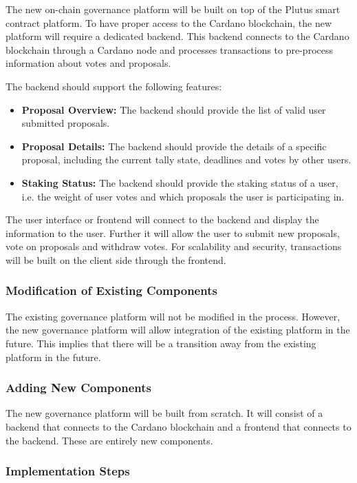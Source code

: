 \documentclass[11pt]{article}
\begin{document}
The new on-chain governance platform will be built on top of the Plutus smart contract platform.
To have proper access to the Cardano blockchain, the new platform will require a dedicated backend.
This backend connects to the Cardano blockchain through a Cardano node and processes transactions
to pre-process information about votes and proposals.

The backend should support the following features:
\begin{itemize}
    \item \textbf{Proposal Overview:} The backend should provide the list of valid user submitted proposals.
    \item \textbf{Proposal Details:} The backend should provide the details of a specific proposal, including the current tally state, deadlines and votes by other users.
    \item \textbf{Staking Status:} The backend should provide the staking status of a user, i.e. the weight of user votes and which proposals the user is participating in.
\end{itemize}

The user interface or frontend will connect to the backend and display the information to the user.
Further it will allow the user to submit new proposals, vote on proposals and withdraw votes.
For scalability and security, transactions will be built on the client side through the frontend.

\subsubsection{Modification of Existing Components}

The existing governance platform will not be modified in the process.
However, the new governance platform will allow integration of the existing platform in the future.
This implies that there will be a transition away from the existing platform in the future.


\subsubsection{Adding New Components}

The new governance platform will be built from scratch.
It will consist of a backend that connects to the Cardano blockchain and a frontend that connects to the backend.
These are entirely new components.

\subsubsection{Implementation Steps}
\end{document}
